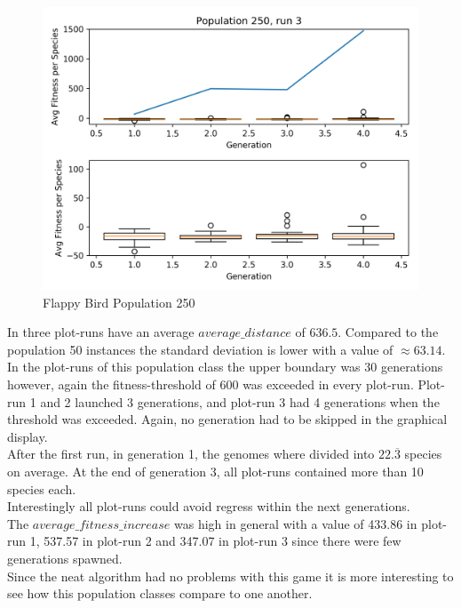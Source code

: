\begin{figure}[h]
				\begin{minipage}{0.33\textwidth}
					\centering
					\includegraphics[width=1\textwidth]{graphics/flappy/pop250_run3} %
				\end{minipage}
				\caption{Flappy Bird Population 250}
				\label{fig:flappy250}
			\end{figure}
			In three plot-runs have an average $average\_distance$ of $636.5$. Compared to the population 50 instances the standard deviation is lower with a value of $\approx63.14$. 
			In the plot-runs of this population class the upper boundary was $30$ generations however, again the fitness-threshold of 600 was exceeded in every plot-run. Plot-run 1 and 2 launched 3 generations, and plot-run 3 had 4 generations when the threshold was exceeded. Again, no generation had to be skipped in the graphical display.\\
			After the first run, in generation 1, the genomes where divided into $22.\overline{3}$ species on average. At the end of generation 3, all plot-runs contained more than 10 species each.\\
			Interestingly all plot-runs could avoid regress within the next generations. \\
			The $average\_fitness\_increase$ was high in general with a value of 433.86 in plot-run 1, 537.57 in plot-run 2 and 347.07 in plot-run 3 since there were few generations spawned.\\
			Since the \gls{neat} algorithm had no problems with this game it is more interesting to see how this population classes compare to one another.
		

